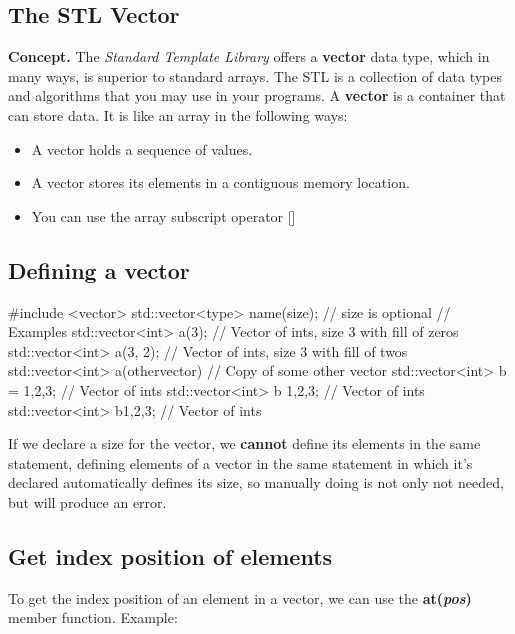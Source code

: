 \documentclass{report}
\begin{document}
    \pagebreak \bigbreak \noindent 
    \subsection{The STL Vector}
    \bigbreak \noindent 
    \textbf{Concept. } The \textit{Standard Template Library} offers a \textbf{vector} data type, which in many ways, is superior to standard arrays.
    \bigbreak \noindent 
    The STL is a collection of data types and algorithms that you may use in your programs. 
    \bigbreak \noindent 
    A \textbf{vector} is a container that can store data. It is like an array in the following ways:
    \begin{itemize}
        \item A vector holds a sequence of values.
        \item A vector stores its elements in a contiguous memory location.
        \item You can use the array subscript operator []
    \end{itemize}

    \bigbreak \noindent 
    \subsection{Defining a vector}
    \bigbreak \noindent 
    
    \begin{cppcode}
#include <vector>
std::vector<type> name(size); // size is optional 
// Examples
std::vector<int> a(3); // Vector of ints, size 3 with fill of zeros
std::vector<int> a(3, 2); // Vector of ints, size 3 with fill of twos
std::vector<int> a(othervector) // Copy of some other vector
std::vector<int> b = {1,2,3}; // Vector of ints
std::vector<int> b {1,2,3}; // Vector of ints
std::vector<int> b{1,2,3}; // Vector of ints
    \end{cppcode}
    
    \bigbreak \noindent 
    \begin{notebox}
        If we declare a size for the vector, we \textbf{cannot} define its elements in the same statement, defining elements of a vector in the same statement in which it's declared automatically defines its size, so manually doing is not only not needed, but will produce an error.
    \end{notebox}

    \bigbreak \noindent 
    \subsection{Get index position of elements}
    \bigbreak \noindent 
    To get the index position of an element in a vector, we can use the \textbf{at(\textit{pos})} member function.
    \bigbreak \noindent 
    Example:
    \bigbreak \noindent 
    
\end{document}
